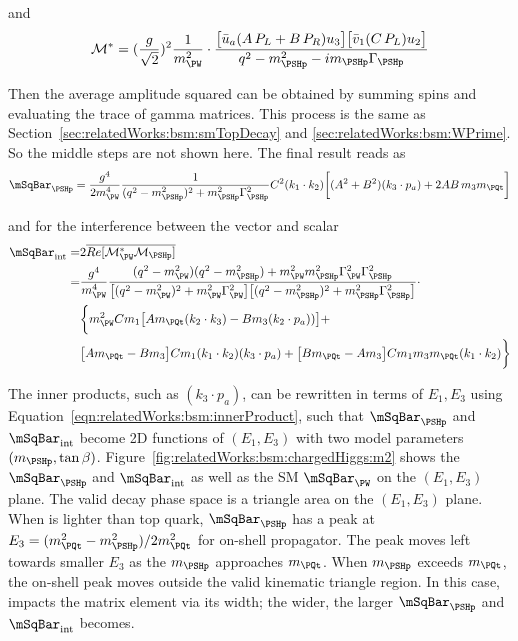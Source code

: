 \noindent and
\begin{equation}
	\mathcal{M}^*  =  (\frac{g   }{\sqrt{2}})^2 \frac{1}{m^2_{\PW}}  \cdot 
    \frac{ \big[ \bar{u}_a  (A \, P_L + B  \, P_R) u_3 \big] \big[ \bar{v}_1 ( C  \, P_L) u_2 \big]  }{q^2-m^2_{\PSHp} - i m_{\PSHp} \Gamma_{\PSHp}} 
\end{equation}

\noindent Then the average amplitude squared can be obtained by summing spins and evaluating the trace of gamma matrices. This process is the same as Section~\ref{sec:relatedWorks:bsm:smTopDecay} and \ref{sec:relatedWorks:bsm:WPrime}. So the middle steps are not shown here. The final result reads as
\begin{equation}
	\mSqBar_{\PSHp} = \frac{g^4}{2 m^4_{\PW}} \frac{1}{ (q^2-m^2_{\PSHp})^2 +  m^2_{\PSHp} \Gamma^2_{\PSHp}} 
    C^2 (k_1 \cdot k_2) \bigg[ (A^2 + B^2) (k_3 \cdot p_a ) + 2 AB \, m_3  m_\PQt\bigg]
\end{equation}


\noindent and for the interference between the vector \PW and scalar \PSHp 
\begin{equation}
\begin{split}
    \mSqBar _{\mathrm{int}} = &   2 \overline{ Re[\mathcal{M}^*_{\PW} \mathcal{M}_{\PSHp}] }  \\
    =& \frac{g ^4}{m_\PW^4} \frac
    {( q^2-m^2_{\PW}) ( q^2-m^2_{\PSHp}) + m^2_{\PW}  m^2_{\PSHp}  \Gamma^2_{\PW} \Gamma^2_{\PSHp} }
    { \big[ ( q^2-m^2_{\PW})^2 +  m^2_{\PW} \Gamma^2_{\PW} \big] \big[ (  q^2-m^2_{\PSHp})^2 +  m^2_{\PSHp} \Gamma^2_{\PSHp} \big] }  \cdot \\
    & \bigg\{
    m_\PW^2  C m_1 \big[A  m_\PQt (k_2 \cdot k_3) - B m_3 (k_2 \cdot p_a) ) \big] + \\
    & \big[A m_\PQt - B m_3 \big] C m_1  (k_1 \cdot k_2) (k_3 \cdot p_a)   +  \big[B m_\PQt - A m_3\big]  C m_1 m_3  m_\PQt (k_1 \cdot k_2)  
    \bigg\}
\end{split}
\end{equation}

\noindent The inner products, such as $(k_3 \cdot p_a) $, can be rewritten in terms of $E_1, E_3$ using Equation~\ref{eqn:relatedWorks:bsm:innerProduct}, such that $\mSqBar _{\PSHp}$ and $ \mSqBar _{\mathrm{int}}$ become 2D functions of $(E_1, E_3)$  with two model parameters $(m_{\PSHp}, \tan\beta)$. Figure~\ref{fig:relatedWorks:bsm:chargedHiggs:m2} shows the $\mSqBar _{\PSHp}$ and $ \mSqBar _{\mathrm{int}}$ as well as the SM $\mSqBar _{\PW}$ on the $(E_1, E_3)$  plane. The valid decay phase space is a triangle area on the  $(E_1, E_3)$ plane. When \PSHp is lighter than top quark, $\mSqBar _{\PSHp}$ has a peak at $E_3=(m_\PQt^2-m_{\PSHp}^2)/2m_\PQt^2$ for on-shell \PSHp propagator. The peak moves left towards smaller $E_3$ as the $m_{\PSHp}$ approaches $m_\PQt$. When $m_{\PSHp}$ exceeds $m_\PQt$, the on-shell \PSHp peak moves outside the valid kinematic triangle region. In this case, \PSHp impacts the matrix element via its width; the wider, the larger $\mSqBar _{\PSHp}$ and $ \mSqBar _{\mathrm{int}}$ becomes.


